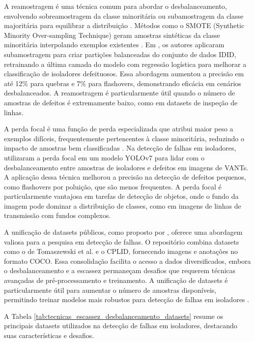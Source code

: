 A reamostragem é uma técnica comum para abordar o desbalanceamento, envolvendo sobreamostragem da classe minoritária ou subamostragem da classe majoritária para equilibrar a distribuição \cite{johnson2019survey}. Métodos como o SMOTE (Synthetic Minority Over-sampling Technique) geram amostras sintéticas da classe minoritária interpolando exemplos existentes \cite{chawla2002smote}. Em , os autores aplicaram subamostragem para criar partições balanceadas do conjunto de dados IDID, retrainando a última camada do modelo com regressão logística para melhorar a classificação de isoladores defeituosos. Essa abordagem aumentou a precisão em até 12\% para quebras e 7\% para flashovers, demonstrando eficácia em cenários desbalanceados. A reamostragem é particularmente útil quando o número de amostras de defeitos é extremamente baixo, como em datasets de inspeção de linhas.

A perda focal é uma função de perda especializada que atribui maior peso a exemplos difíceis, frequentemente pertencentes à classe minoritária, reduzindo o impacto de amostras bem classificadas \cite{lin2017focal}. Na detecção de falhas em isoladores,  utilizaram a perda focal em um modelo YOLOv7 para lidar com o desbalanceamento entre amostras de isoladores e defeitos em imagens de VANTs. A aplicação dessa técnica melhorou a precisão na detecção de defeitos pequenos, como flashovers por poluição, que são menos frequentes. A perda focal é particularmente vantajosa em tarefas de detecção de objetos, onde o fundo da imagem pode dominar a distribuição de classes, como em imagens de linhas de transmissão com fundos complexos.

A unificação de datasets públicos, como proposto por , oferece uma abordagem valiosa para a pesquisa em detecção de falhas. O repositório combina datasets como o de Tomaszewski et al. e o CPLID, fornecendo imagens e anotações no formato COCO. Essa consolidação facilita o acesso a dados diversificados, embora o desbalanceamento e a escassez permaneçam desafios que requerem técnicas avançadas de pré-processamento e treinamento. A unificação de datasets é particularmente útil para aumentar o número de amostras disponíveis, permitindo treinar modelos mais robustos para detecção de falhas em isoladores \cite{felix2020unifying}.

A Tabela \ref{tab:tecnicas_escassez_desbalanceamento_datasets} resume os principais datasets utilizados na detecção de falhas em isoladores, destacando suas características e desafios.

